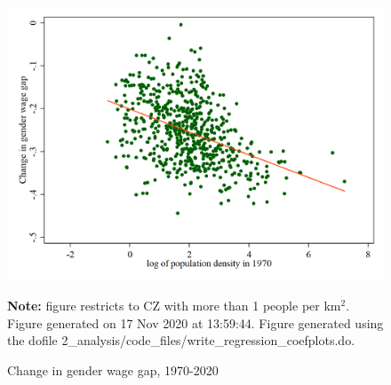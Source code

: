 \begin{figure}[!h]
\centering
\caption{Change in gender wage gap, 1970-2020}
\includegraphics[width=1\textwidth]{../2_analysis/output/figures/change_1970_2020}
\par \begin{minipage}[h]{\textwidth}{\tiny\textbf{Note:} figure restricts to CZ with more than 1 people per km$^2$. Figure generated on 17 Nov 2020 at 13:59:44. Figure generated using the dofile 2\_analysis/code\_files/write\_regression\_coefplots.do.}\end{minipage}
\end{figure}
